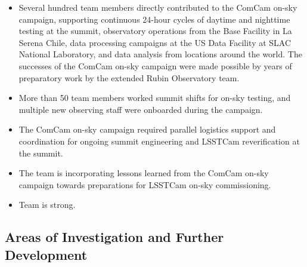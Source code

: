 \begin{itemize}
\begin{itemize}
        \item Several hundred team members directly contributed to the ComCam on-sky campaign, supporting continuous 24-hour cycles of daytime and nighttime testing at the summit, observatory operations from the Base Facility in La Serena Chile, data processing campaigns at the US Data Facility at SLAC National Laboratory, and data analysis from locations around the world.
        The successes of the ComCam on-sky campaign were made possible by years of preparatory work by the extended Rubin Observatory team.
        \item More than 50 team members worked summit shifts for on-sky testing, and multiple new observing staff were onboarded during the campaign.
        \item The ComCam on-sky campaign required parallel logistics support and coordination for ongoing summit engineering and LSSTCam reverification at the summit.
        \item The team is incorporating lessons learned from the ComCam on-sky campaign towards preparations for LSSTCam on-sky commissioning.
        \item Team is strong.
    \end{itemize}
\end{itemize}

\subsection{Areas of Investigation and Further Development}

